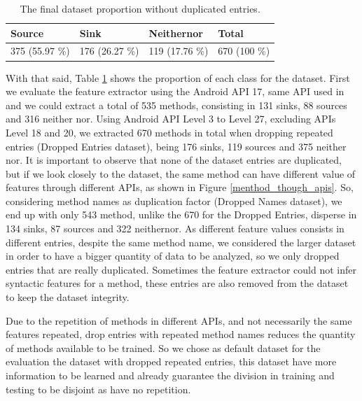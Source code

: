 \begin{table}[hb!]
    \centering
    \renewcommand{\arraystretch}{1.8}
    \begin{tabular}{p{2.5cm}p{2.5cm}p{2.5cm}p{2.5cm} }
        \toprule
        Source & Sink & Neithernor & Total\\
        \midrule
        375 (55.97 \%) & 176 (26.27 \%) & 119 (17.76 \%) & 670 (100 \%)\\ [1ex]
        \bottomrule
        \end{tabular}
        \caption{%
        The final dataset proportion without duplicated entries.%
        }\label{dset_prop}
\end{table}

With that said, Table \ref{dset_prop} shows the proportion of each class for the dataset. First we evaluate the feature extractor using the Android API 17, same API used in \cite{rasthofer2014machine} and we could extract a total of 535 methods, consisting in 131 sinks, 88 sources and 316 neither nor. Using Android API Level 3 to Level 27, excluding APIs Level 18 and 20, we extracted 670 methods in total when dropping repeated entries (Dropped Entries dataset), being 176 sinks, 119 sources and 375 neither nor. It is important to observe that none of the dataset entries are duplicated, but if we look closely to the dataset, the same method can have different value of features through different APIs, as shown in Figure \ref{menthod_though_apis}. So, considering method names as duplication factor (Dropped Names dataset), we end up with only 543 method, unlike the 670 for the Dropped Entries, disperse in 134 sinks, 87 sources and 322 neithernor. As different feature values consists in different entries, despite the same method name, we considered the larger dataset in order to have a bigger quantity of data to be analyzed, so we only dropped entries that are really duplicated. Sometimes the feature extractor could not infer syntactic features for a method, these entries are also removed from the dataset to keep the dataset integrity.

Due to the repetition of methods in different APIs, and not necessarily the same features repeated, drop entries with repeated method names reduces the quantity of methods available to be trained. So we chose as default dataset for the evaluation the dataset with dropped repeated entries, this dataset have more information to be learned and already guarantee the division in training and testing to be disjoint as have no repetition.

